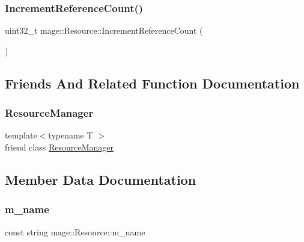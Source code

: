 \hypertarget{classmage_1_1_resource_a828bf8678979bfa92f2d2df81b60c57f}{}\label{classmage_1_1_resource_a828bf8678979bfa92f2d2df81b60c57f} 
\subsubsection{\texorpdfstring{Increment\+Reference\+Count()}{IncrementReferenceCount()}}
{\footnotesize\ttfamily uint32\+\_\+t mage\+::\+Resource\+::\+Increment\+Reference\+Count (\begin{DoxyParamCaption}{ }\end{DoxyParamCaption})\hspace{0.3cm}{\ttfamily [private]}}



\subsection{Friends And Related Function Documentation}
\hypertarget{classmage_1_1_resource_a51a7bf7c13d389aeee09c16059ca41c9}{}\label{classmage_1_1_resource_a51a7bf7c13d389aeee09c16059ca41c9} 
\subsubsection{\texorpdfstring{Resource\+Manager}{ResourceManager}}
{\footnotesize\ttfamily template$<$typename T $>$ \\
friend class \hyperlink{classmage_1_1_resource_manager}{Resource\+Manager}\hspace{0.3cm}{\ttfamily [friend]}}



\subsection{Member Data Documentation}
\hypertarget{classmage_1_1_resource_a93019b74e9665195f1af17c60b6d171a}{}\label{classmage_1_1_resource_a93019b74e9665195f1af17c60b6d171a} 
\subsubsection{\texorpdfstring{m\+\_\+name}{m\_name}}
{\footnotesize\ttfamily const string mage\+::\+Resource\+::m\+\_\+name\hspace{0.3cm}{\ttfamily [private]}}

